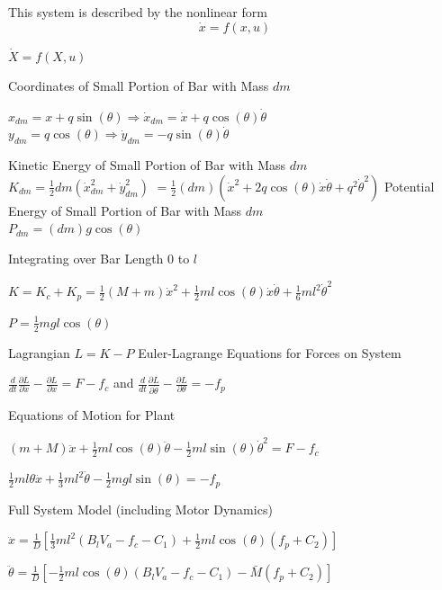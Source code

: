 \documentclass[conference]{IEEEtran}
\begin{document}
This system is described by the nonlinear form 
\begin{equation}
\dot{x}=f(x,u)
\label{eq:nonlinearSystem}
\end{equation}

$\dot{X}=f\left(X,u\right)$

Coordinates of Small Portion of Bar with Mass $dm$

$x_{dm}=x+q\sin\left(\theta\right)\Rightarrow\dot{x}_{dm}=\dot{x}+q\cos\left(\theta\right)\dot{\theta}$\\$y_{dm}=q\cos\left(\theta\right)\Rightarrow\dot{y}_{dm}=-q\sin\left(\theta\right)\dot{\theta}$

Kinetic Energy of Small Portion of Bar with Mass
$dm$\\$K_{dm}=\frac{1}{2}dm\left(\dot{x}_{dm}^2+\dot{y}_{dm}^2\right)$ $=\frac{1}{2}\left(dm\right)\left(\dot{x}^2+2q\cos\left(\theta\right)\dot{x}\dot{\theta}+q^2\dot{\theta}^2\right)$
Potential Energy of Small Portion of Bar with Mass $dm$\\$P_{dm}=\left(dm\right)g\cos\left(\theta\right)$

Integrating over Bar Length $0$ to $l$

$K=K_c+K_p=\frac{1}{2}\left(M+m\right)\dot{x}^2+\frac{1}{2}ml\cos\left(\theta\right)\dot{x}\dot{\theta}+\frac{1}{6}ml^2\dot{\theta}^2$

$P=\frac{1}{2}mgl\cos\left(\theta\right)$

Lagrangian $L=K-P$
Euler-Lagrange Equations for Forces on System

$\frac{d}{dt}\frac{\partial L}{\partial\dot{x}}-\frac{\partial L}{\partial x}=F-f_c$ and $\frac{d}{dt}\frac{\partial L}{\partial\dot{\theta}}-\frac{\partial L}{\partial \theta}=-f_p$

Equations of Motion for Plant

$\left(m+M\right)\ddot{x}+\frac{1}{2}ml\cos\left(\theta\right)\ddot{\theta}-\frac{1}{2}ml\sin\left(\theta\right)\dot{\theta}^2=F-f_c$

$\frac{1}{2}ml\mathsf{\theta}\ddot{x}+\frac{1}{3}ml^2\ddot{\theta}-\frac{1}{2}mgl\sin\left(\theta\right)=-f_p$

Full System Model (including Motor Dynamics)

$\ddot{x}=\frac{1}{D}\left[\frac{1}{3}ml^2\left(B_lV_a-f_c-C_1\right)+\frac{1}{2}ml\cos\left(\theta\right)\left(f_p+C_2\right)\right]$

$\ddot{\theta}=\frac{1}{D}\left[-\frac{1}{2}ml\cos\left(\theta\right)\left(B_lV_a-f_c-C_1\right)-\bar{M}\left(f_p+C_2\right)\right]$
\end{document}

